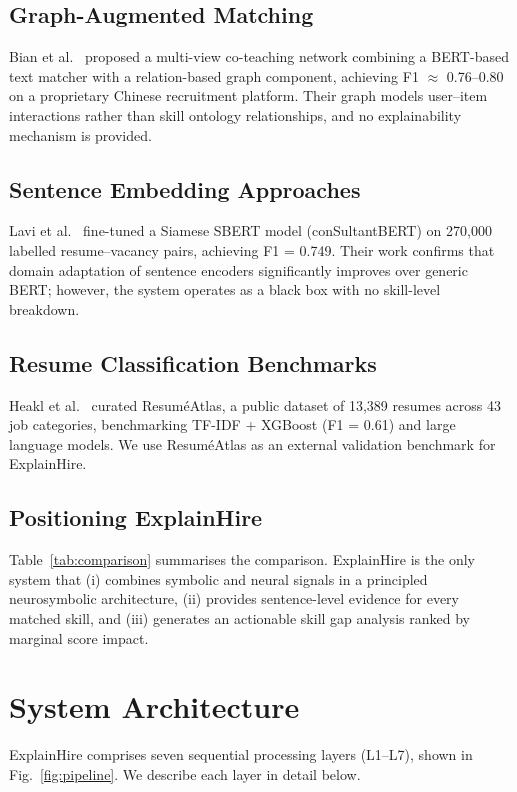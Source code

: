 \documentclass[conference]{IEEEtran}
\begin{document}
\subsection{Graph-Augmented Matching}
Bian et al.~\cite{bian2020multiview} proposed a multi-view co-teaching
network combining a BERT-based text matcher with a relation-based graph
component, achieving F1 $\approx$ 0.76--0.80 on a proprietary Chinese
recruitment platform. Their graph models user--item interactions rather than
skill ontology relationships, and no explainability mechanism is provided.

\subsection{Sentence Embedding Approaches}
Lavi et al.~\cite{lavi2021consultantbert} fine-tuned a Siamese SBERT model
(conSultantBERT) on 270,000 labelled resume--vacancy pairs, achieving F1 =
0.749. Their work confirms that domain adaptation of sentence encoders
significantly improves over generic BERT; however, the system operates as a
black box with no skill-level breakdown.

\subsection{Resume Classification Benchmarks}
Heakl et al.~\cite{heakl2024resumeatlas} curated ResuméAtlas, a public
dataset of 13,389 resumes across 43 job categories, benchmarking
TF-IDF + XGBoost (F1 = 0.61) and large language models. We use ResuméAtlas
as an external validation benchmark for ExplainHire.

\subsection{Positioning ExplainHire}
Table~\ref{tab:comparison} summarises the comparison. ExplainHire is the
only system that (i) combines symbolic and neural signals in a principled
neurosymbolic architecture, (ii) provides sentence-level evidence for every
matched skill, and (iii) generates an actionable skill gap analysis ranked
by marginal score impact.

\section{System Architecture}

ExplainHire comprises seven sequential processing layers (L1--L7), shown in
Fig.~\ref{fig:pipeline}. We describe each layer in detail below.
\end{document}
